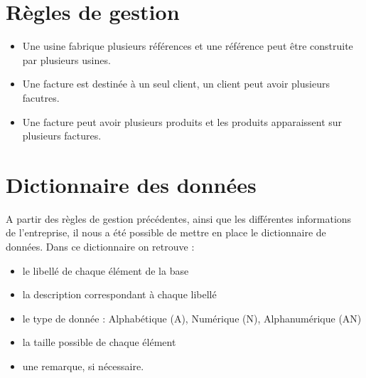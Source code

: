 \documentclass[french]{article}
\begin{document}
\begin{titlepage}
\vfill

\end{titlepage}

\newpage

\tableofcontents

\newpage

\section{Règles de gestion}
\begin{itemize}
    \item Une usine fabrique plusieurs références et une référence peut être construite par plusieurs usines.
    \item Une facture est destinée à un seul client, un client peut avoir plusieurs facutres.
    \item Une facture peut avoir plusieurs produits et les produits apparaissent sur plusieurs factures.

\end{itemize}

\section{Dictionnaire des données}

A partir des règles de gestion précédentes, ainsi que les différentes informations de l'entreprise, il nous a été possible de mettre en place le dictionnaire de données. Dans ce dictionnaire on retrouve :
\begin{itemize}
    \item le libellé de chaque élément de la base
    \item la description correspondant à chaque libellé
    \item le type de donnée : Alphabétique (A), Numérique (N), Alphanumérique (AN)
    \item la taille possible de chaque élément
    \item une remarque, si nécessaire.
\end{itemize}
\end{document}
